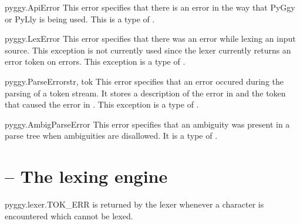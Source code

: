 \begin{excdesc}{pyggy.ApiError}
This error specifies that there is an error in the way that
PyGgy or PyLly is being used.  This is a type of .
\end{excdesc}

\begin{excdesc}{pyggy.LexError}
This error specifies that there was an error while lexing an
input source.  This exception is not currently used since the lexer
currently returns an error token on errors.  This exception is a
type of .
\end{excdesc}

\begin{excclassdesc}{pyggy.ParseError}{str, tok}
This error specifies that an error occured during the parsing of
a token stream.  It stores a description of the error in 
and the token that caused the error in .  This exception
is a type of .
\end{excclassdesc}

\begin{excdesc}{pyggy.AmbigParseError}
This error specifies that an ambiguity was present in a parse tree
when ambiguities are disallowed.  It is a type of .
\end{excdesc}


\section{ -- The lexing engine}

\begin{datadesc}{pyggy.lexer.TOK\_ERR}
 is returned by the lexer whenever a character is encountered
which cannot be lexed.
\end{datadesc}

